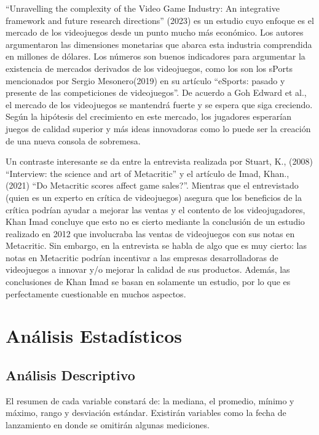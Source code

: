 \documentclass[
  letterpaper,
  DIV=11,
  numbers=noendperiod]{scrreprt}
\begin{document}
``Unravelling the complexity of the Video Game Industry: An integrative
framework and future research directions'' (2023) es un estudio cuyo
enfoque es el mercado de los videojuegos desde un punto mucho más
económico. Los autores argumentaron las dimensiones monetarias que
abarca esta industria comprendida en millones de dólares. Los números
son buenos indicadores para argumentar la existencia de mercados
derivados de los videojuegos, como los son los sPorts mencionados por
Sergio Mesonero(2019) en su artículo ``eSports: pasado y presente de las
competiciones de videojuegos''. De acuerdo a Goh Edward et al., el
mercado de los videojuegos se mantendrá fuerte y se espera que siga
creciendo. Según la hipótesis del crecimiento en este mercado, los
jugadores esperarían juegos de calidad superior y más ideas innovadoras
como lo puede ser la creación de una nueva consola de sobremesa.

Un contraste interesante se da entre la entrevista realizada por Stuart,
K., (2008) ``Interview: the science and art of Metacritic'' y el
artículo de Imad, Khan., (2021) ``Do Metacritic scores affect game
sales?''. Mientras que el entrevistado (quien es un experto en crítica
de videojuegos) asegura que los beneficios de la crítica podrían ayudar
a mejorar las ventas y el contento de los videojugadores, Khan Imad
concluye que esto no es cierto mediante la conclusión de un estudio
realizado en 2012 que involucraba las ventas de videojuegos con sus
notas en Metacritic. Sin embargo, en la entrevista se habla de algo que
es muy cierto: las notas en Metacritic podrían incentivar a las empresas
desarrolladoras de videojuegos a innovar y/o mejorar la calidad de sus
productos. Además, las conclusiones de Khan Imad se basan en solamente
un estudio, por lo que es perfectamente cuestionable en muchos aspectos.


\hypertarget{anuxe1lisis-estaduxedsticos}{%
\chapter{Análisis Estadísticos}\label{anuxe1lisis-estaduxedsticos}}

\hypertarget{anuxe1lisis-descriptivo}{%
\section{Análisis Descriptivo}\label{anuxe1lisis-descriptivo}}

El resumen de cada variable constará de: la mediana, el promedio, mínimo
y máximo, rango y desviación estándar. Existirán variables como la fecha
de lanzamiento en donde se omitirán algunas mediciones.
\end{document}
